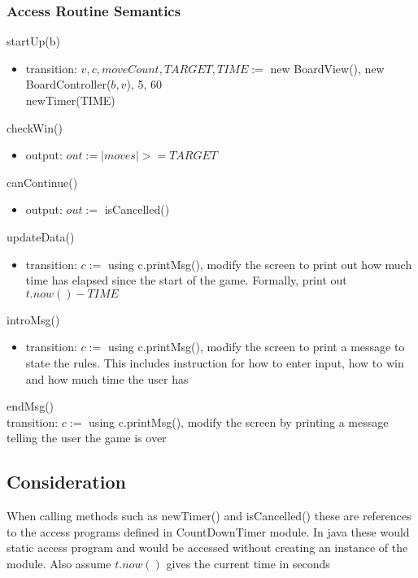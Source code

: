 \documentclass[12pt]{article}
\begin{document}
\subsubsection* {Access Routine Semantics}

\noindent startUp(b)
\begin{itemize}
\item transition: $v,c,moveCount,TARGET,TIME :=$  new BoardView(), new BoardController($b,v$), 5, 60\\
newTimer(TIME) 
\end{itemize}


\noindent checkWin()
\begin{itemize}
\item output: $out := |moves| >= TARGET$
\end{itemize}

\noindent canContinue()
\begin{itemize}
\item output: $out := $ isCancelled()
\end{itemize}


\noindent updateData()
\begin{itemize}
\item transition: $c := $ using c.printMsg(), modify the screen to print out how much time has elapsed since the start of the game. Formally, print out $t.now() - TIME$
\end{itemize}


\noindent introMsg()
\begin{itemize}
\item transition: $c :=$ using c.printMsg(), modify the screen to print a message to state the rules. This includes instruction for how to enter input, how to win and how much time the user has
\end{itemize}

\noindent endMsg()\\
\noindent transition: $c :=$ using c.printMsg(), modify the screen by printing a message telling the user the game is over

\subsection*{Consideration}
\noindent When calling methods such as newTimer() and isCancelled() these are references to the access programs defined in CountDownTimer module. In java these would static access program and would be accessed without creating an instance of the module. Also assume $t.now()$ gives the current time in seconds
\end{document}
